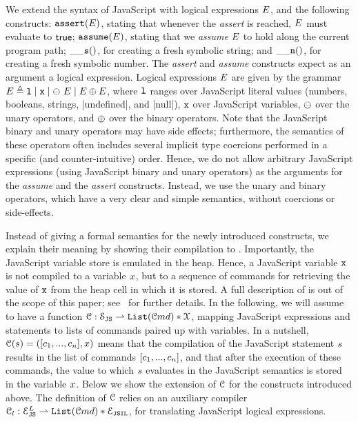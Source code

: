 We extend the syntax of JavaScript with logical expressions $E$, 
and the following constructs: %
 $\mathtt{assert}(E)$, stating that whenever the \emph{assert} is reached, 
$E$ must evaluate to ${\sf true}$; 
 $\mathtt{assume}(E)$, stating that we \emph{assume} $E$ to hold along the
current program path; 
 $\_\_{\mathtt{s}}()$, for creating a fresh symbolic string; and
 $\_\_{\mathtt{n}}()$, for creating a fresh symbolic number. 
The \emph{assert} and \emph{assume} constructs expect as an argument 
a logical expression. 
Logical expressions $E$ are given by the grammar 
$E \triangleq \mathtt{l} \mid \mathtt{x} \mid \ominus\ E \mid E \oplus E$, 
where $\mathtt{l}$ ranges over JavaScript literal values (numbers, booleans, strings, \jsinline|undefined|, and \jsinline|null|), $\mathtt{x}$ over JavaScript variables, 
$\ominus$ over the \jsil unary operators, and $\oplus$ over the \jsil binary operators.
Note that the JavaScript binary and unary operators may have side effects; furthermore,  
the semantics of these operators often includes several implicit type coercions 
performed in a specific (and counter-intuitive) order. 
Hence, we do not allow arbitrary JavaScript expressions (using JavaScript 
binary and unary operators) as the arguments for the \emph{assume} and 
the \emph{assert} constructs. Instead, we use the \jsil unary and binary operators, which have a very clear and simple semantics, without coercions or side-effects.

Instead of giving a formal semantics for the newly introduced constructs, we explain 
their meaning by showing their compilation to \jsil. 
Importantly, the JavaScript variable store is emulated in the heap. 
Hence, a JavaScript variable $\mathtt{x}$ is not compiled to a \jsil variable $x$, but to a sequence  
of \jsil commands for retrieving the value of $\mathtt{x}$ from the heap cell in which it is stored. 
A full description of \JSComp is out of the scope of this paper; see~\cite{Daiva2017}
for further details.
%
In the following, we will assume to have a function ${\mathcal C} : \mathcal{S}_{\mathtt{JS}} \rightharpoonup \mathtt{List}(\mathcal{C}md) * \mathcal{X}$, mapping JavaScript expressions 
and statements to lists of \jsil commands paired up with \jsil variables. 
In a nutshell, ${\mathcal C}(s) = ([ c_1, ..., c_n], x)$ means that the compilation 
of the JavaScript statement $s$ results in the list of \jsil commands $[ c_1, ..., c_n]$, 
and that after the execution of these commands, the value to which $s$ evaluates in the 
JavaScript semantics is stored in the \jsil variable $x$. 
%
Below we show the extension of ${\mathcal C}$ for the constructs introduced above. 
The definition of ${\mathcal C}$ relies on an auxiliary compiler ${\mathcal C}_l : \mathcal{E}_{\mathtt{JS}}^L \rightharpoonup \mathtt{List}(\mathcal{C}md) * \mathcal{E}_{\mathtt{JSIL}}$, 
for translating JavaScript logical expressions.

